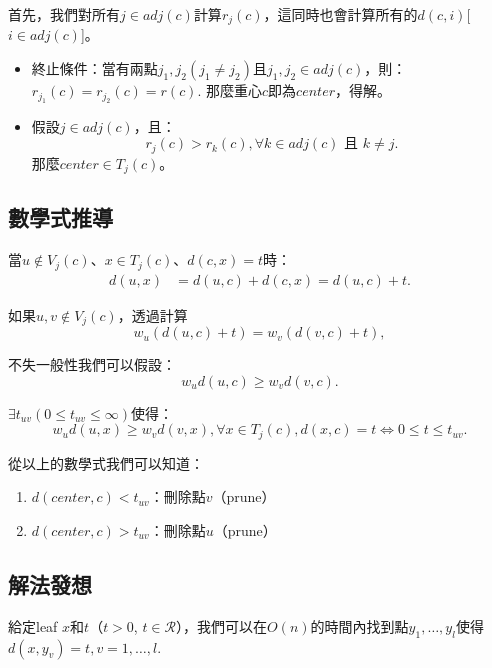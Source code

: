 \documentclass[15pt]{extarticle}
\begin{document}
首先，我們對所有$j\in adj(c)$計算$r_j(c)$，這同時也會計算所有的$d(c,i)$[$i\in adj(c)$]。

\begin{itemize}
    \item 終止條件：當有兩點$j_1,j_2(j_1\ne j_2)$且$j_1,j_2\in adj(c)$，則：
        $r_{j_1}(c) = r_{j_2}(c)=r(c).$
        那麼重心$c$即為$center$，得解。
    \item 假設$j\in adj(c)$，且：
        $$r_j(c) > r_k(c), \forall k\in adj(c)\mbox{ 且 } k\ne j.$$
        那麼$center\in T_j(c)$。
\end{itemize}

\subsection{數學式推導}
當$u\notin V_j(c)$、$x\in T_j(c)$、$d(c, x) = t$時：
\begin{align*}
    d(u,x)  &= d(u,c) + d(c,x) = d(u,c) + t. \tag{1} 
\end{align*}

如果$u,v\notin V_j(c)$，透過計算 
\begin{equation*}
    w_u(d(u,c)+t)=w_v(d(v,c)+t), \tag{2}
\end{equation*}
    
不失一般性我們可以假設：
\begin{equation*}
    w_ud(u,c)\ge w_vd(v,c). \tag{3}
\end{equation*}

$\exists t_{uv}(0\le t_{uv}\le\infty)$使得：
\begin{equation*}
    w_ud(u,x)\ge w_vd(v,x), \forall x\in T_j(c), d(x,c)=t \Leftrightarrow 0\le t\le t_{uv}. \tag{4}    
\end{equation*}

從以上的數學式我們可以知道：
\begin{enumerate}
    \item $d(center, c) < t_{uv}$：刪除點$v$（prune）
    \item $d(center, c) > t_{uv}$：刪除點$u$（prune）
\end{enumerate}


\newpage

\subsection{解法發想}
給定leaf $x$和$t$（$t>0$, $t\in\mathcal R$），我們可以在$O(n)$的時間內找到點$y_1,\dots, y_l$使得$d(x,y_v)=t, v=1,\dots,l$.
\end{document}
